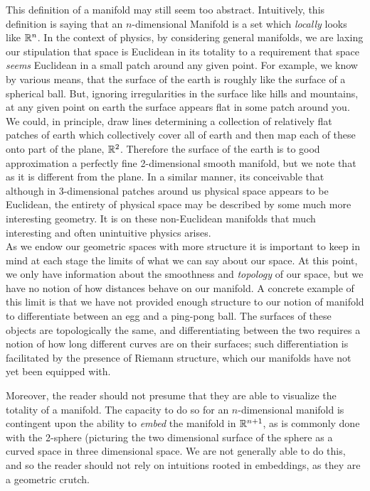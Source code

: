 This definition of a manifold may still seem too abstract.  Intuitively, this definition is saying that an $n$-dimensional Manifold is a set which \textit{locally} looks like $\mathbb{R}^n$.  In the context of physics, by considering general manifolds, we are laxing our stipulation that space is Euclidean in its totality to a requirement that space \textit{seems} Euclidean in a small patch around any given point. For example, we know by various means, that the surface of the earth is roughly like the surface of a spherical ball.  But, ignoring irregularities in the surface like hills and mountains, at any given point on earth the surface appears flat in some patch around you.  We could, in principle, draw lines determining a collection of relatively flat patches of earth which collectively cover all of earth and then map each of these onto part of the plane, $\mathbb{R}^2$.  Therefore the surface of the earth is to good approximation a perfectly fine 2-dimensional smooth manifold, but we note that as it is different from the plane.  In a similar manner, its conceivable that although in 3-dimensional patches  around us physical space appears to be Euclidean, the entirety of physical space may be described by some much more interesting geometry.  It is on these non-Euclidean manifolds that much interesting and often unintuitive physics arises.\\

As we endow our geometric spaces with more  structure it is important to keep in mind at each stage the limits of what we can say about our space.  At this point, we only have information about the smoothness and \textit{topology} of our space, but we have no notion of how distances behave on our manifold.  A concrete example of this limit is that we have not provided enough structure to our notion of manifold to differentiate between an egg and a  ping-pong ball.  The surfaces of these objects are topologically the same, and differentiating between the two requires a notion of how long different curves are on their surfaces; such differentiation is facilitated by the presence of Riemann structure, which our manifolds have not yet been equipped with.

Moreover, the reader should not presume that they are able to visualize the totality of a manifold.  The capacity to do so for an $n$-dimensional manifold is contingent upon the ability to \textit{embed} the manifold in $\mathbb{R}^{n+1}$, as is commonly done with the 2-sphere (picturing the two dimensional surface of the sphere as a curved space in three dimensional space.  We are not generally able to do this, and so the reader should not rely on intuitions rooted in embeddings, as they are a geometric crutch.

